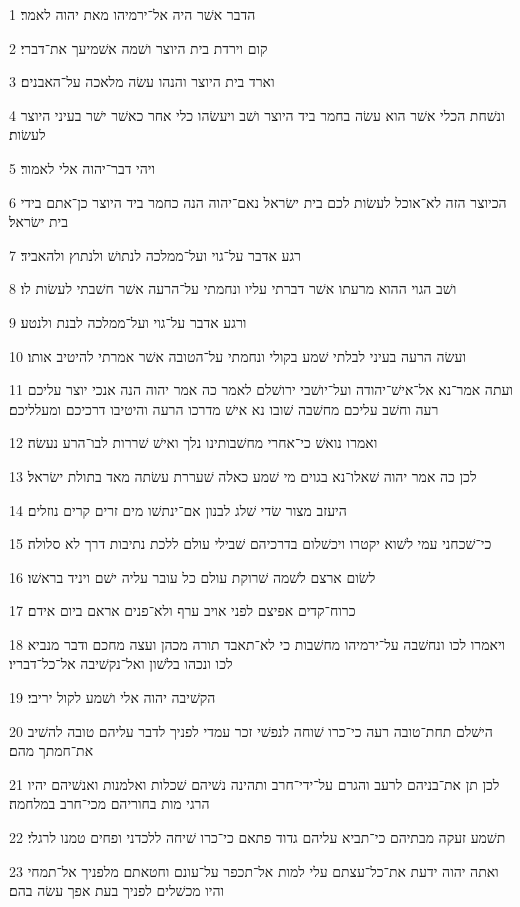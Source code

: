 \par 1 הדבר אשׁר היה אל־ירמיהו מאת יהוה לאמר׃
\par 2 קום וירדת בית היוצר ושׁמה אשׁמיעך את־דברי׃
\par 3 וארד בית היוצר והנהו עשׂה מלאכה על־האבנים׃
\par 4 ונשׁחת הכלי אשׁר הוא עשׂה בחמר ביד היוצר ושׁב ויעשׂהו כלי אחר כאשׁר ישׁר בעיני היוצר לעשׂות׃
\par 5 ויהי דבר־יהוה אלי לאמור׃
\par 6 הכיוצר הזה לא־אוכל לעשׂות לכם בית ישׂראל נאם־יהוה הנה כחמר ביד היוצר כן־אתם בידי בית ישׂראל׃
\par 7 רגע אדבר על־גוי ועל־ממלכה לנתושׁ ולנתוץ ולהאביד׃
\par 8 ושׁב הגוי ההוא מרעתו אשׁר דברתי עליו ונחמתי על־הרעה אשׁר חשׁבתי לעשׂות לו׃
\par 9 ורגע אדבר על־גוי ועל־ממלכה לבנת ולנטע׃
\par 10 ועשׂה הרעה בעיני לבלתי שׁמע בקולי ונחמתי על־הטובה אשׁר אמרתי להיטיב אותו׃
\par 11 ועתה אמר־נא אל־אישׁ־יהודה ועל־יושׁבי ירושׁלם לאמר כה אמר יהוה הנה אנכי יוצר עליכם רעה וחשׁב עליכם מחשׁבה שׁובו נא אישׁ מדרכו הרעה והיטיבו דרכיכם ומעלליכם׃
\par 12 ואמרו נואשׁ כי־אחרי מחשׁבותינו נלך ואישׁ שׁררות לבו־הרע נעשׂה׃
\par 13 לכן כה אמר יהוה שׁאלו־נא בגוים מי שׁמע כאלה שׁעררת עשׂתה מאד בתולת ישׂראל׃
\par 14 היעזב מצור שׂדי שׁלג לבנון אם־ינתשׁו מים זרים קרים נוזלים׃
\par 15 כי־שׁכחני עמי לשׁוא יקטרו ויכשׁלום בדרכיהם שׁבילי עולם ללכת נתיבות דרך לא סלולה׃
\par 16 לשׂום ארצם לשׁמה שׁרוקת עולם כל עובר עליה ישׁם ויניד בראשׁו׃
\par 17 כרוח־קדים אפיצם לפני אויב ערף ולא־פנים אראם ביום אידם׃
\par 18 ויאמרו לכו ונחשׁבה על־ירמיהו מחשׁבות כי לא־תאבד תורה מכהן ועצה מחכם ודבר מנביא לכו ונכהו בלשׁון ואל־נקשׁיבה אל־כל־דבריו׃
\par 19 הקשׁיבה יהוה אלי ושׁמע לקול יריבי׃
\par 20 הישׁלם תחת־טובה רעה כי־כרו שׁוחה לנפשׁי זכר עמדי לפניך לדבר עליהם טובה להשׁיב את־חמתך מהם׃
\par 21 לכן תן את־בניהם לרעב והגרם על־ידי־חרב ותהינה נשׁיהם שׁכלות ואלמנות ואנשׁיהם יהיו הרגי מות בחוריהם מכי־חרב במלחמה׃
\par 22 תשׁמע זעקה מבתיהם כי־תביא עליהם גדוד פתאם כי־כרו שׁיחה ללכדני ופחים טמנו לרגלי׃
\par 23 ואתה יהוה ידעת את־כל־עצתם עלי למות אל־תכפר על־עונם וחטאתם מלפניך אל־תמחי והיו מכשׁלים לפניך בעת אפך עשׂה בהם׃

